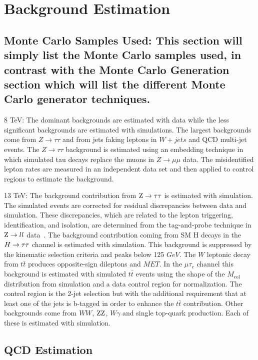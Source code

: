\documentclass[oneside, letterpaper, oldfontcommands]{memoir}
\begin{document}
{{{\section{Background Estimation}

\subsection{Monte Carlo Samples Used: This section will simply list the Monte Carlo samples used, in contrast with the Monte Carlo Generation section which will list the different Monte Carlo generator techniques.}
8 TeV:
The dominant backgrounds are estimated with data  while the less significant
backgrounds are estimated with simulations.  The largest backgrounds come from $Z \to \tau \tau$
and from jets faking leptons in $W+jets$ and QCD multi-jet events. The $Z \to \tau \tau$
background is estimated using an embedding technique in which simulated tau decays replace
the muons in $Z \to \mu \mu$ data. The misidentified lepton rates are measured in an independent data
set and then applied to control regions to estimate the background.



13 TeV:
The background contribution from $\mathrm{Z} \rightarrow \mathrm{\tau}\mathrm{\tau}$ is estimated with simulation. The simulated events are corrected for residual discrepancies between data and simulation. These discrepancies, which are related to the lepton triggering, identification, and isolation, are determined from the tag-and-probe technique in $\mathrm{Z} \rightarrow ll$ data~\cite{Chatrchyan:2012xi, Khachatryan:2015hwa}. The background contribution coming from SM H decays in the $H \rightarrow \mathrm{\tau}\mathrm{\tau}$ channel is
estimated with simulation. This background is suppressed by the kinematic selection criteria
and peaks below 125 $GeV$. The $W$ leptonic decay from  $t\bar{t}$ produces opposite-sign dileptons and $MET$. In the $\mu \tau_{e}$ channel this background is estimated with simulated $t\bar{t}$
events using the shape of the $M_\text{col}$ distribution from simulation and a data control region for
normalization. The control region is the  2-jet selection but with the additional requirement that
at least one of the jets is b-tagged in order to enhance the $t\bar{t}$ contribution.
Other backgrounds come from $WW$, $\mathrm{Z}\mathrm{Z}$, $W\gamma$ and single
top-quark production. Each of these is estimated with simulation.
\subsection{QCD Estimation}
}}}
\end{document}
